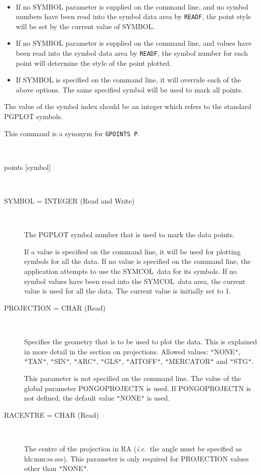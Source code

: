 \documentclass[twoside,11pt]{article}
\newcommand{\htmlref}[2]{#1}
\renewcommand{\_}{\texttt{\symbol{95}}}
\newcommand{\ie}{{\em i.e.\ }}
\newcommand{\symcol}{{\sf SYMCOL}}
\newcommand{\cnam}[1]{{\tt #1}}
\newcommand{\iref} [1]{\htmlref{#1}{#1}}
\newcommand{\sstusage}[1]{\item[Usage:] \mbox{}
\\[1.3ex]{\raggedright \ssttt #1}}
\newcommand{\sstparameters}[1]{
   \item[Parameters:] \mbox{} \\
   \vspace{-3.5ex}
   \begin{description}
      #1
   \end{description}
}
\newcommand{\sstsubsection}[1]{ \item[{#1}] \mbox{} \\}
\newcommand{\sstitemlist}[1]{
  \mbox{} \\
  \vspace{-3.5ex}
  \begin{itemize}
     #1
  \end{itemize}
}
\newcommand{\sstitem}{\item}
\newcommand{\sstusage}[1]{\item[Usage:]
      \begin{description}
         {\ssttt #1}
      \end{description}
      \\
   }
\newcommand{\sstparameters}[1]{
      \item[Parameters:] \\
      \begin{description}
         #1
      \end{description}
      \\
   }
\newcommand{\sstsubsection}[1]{\item[{#1}]}
\newcommand{\sstitemlist}[1]{
      \begin{itemize}
         #1
      \end{itemize}
      \\
   }
\newcommand{\sstitem}{\item}
\begin{document}
\begin{sloppypar}
{{      \sstitemlist{

         \sstitem
            If no SYMBOL parameter is supplied on the command line, and
            no symbol numbers have been read into the symbol data area by
            \cnam{\iref{READF}}, the point style will be set by the current value of
            SYMBOL.

         \sstitem
            If no SYMBOL parameter is supplied on the command line, and
            values have been read into the symbol data area by \cnam{READF}, the
            symbol number for each point will determine the style of the
            point plotted.

         \sstitem
            If SYMBOL is specified on the command line, it will override
            each of the above options. The same specified symbol will be
            used to mark all points.

      }
      The value of the symbol index should be an integer which refers
      to the standard PGPLOT symbols.

      This command is a synonym for \cnam{\iref{GPOINTS} P}.
   }
   \sstusage{
      points [symbol]
   }
\newpage
   \sstparameters{
      \sstsubsection{
         SYMBOL = \_INTEGER (Read and Write)
      }{
         The PGPLOT symbol number that is used to mark the data points.

         If a value is specified on the command line, it will be used
         for plotting symbols for all the data. If no value is
         specified on the command line, the application attempts to use
         the \symcol\ data for its symbols. If no symbol values have been
         read into the \symcol\ data area, the current value is used for
         all the data. The current value is initially set to 1.
      }
      \sstsubsection{
         PROJECTION = \_CHAR (Read)
      }{
         Specifies the geometry that is to be used to plot the data.
         This is explained in more detail in the section on
         projections.  Allowed values: {\tt "}NONE{\tt "}, {\tt "}TAN{\tt "}, {\tt "}SIN{\tt "}, {\tt "}ARC{\tt "},
         {\tt "}GLS{\tt "}, {\tt "}AITOFF{\tt "}, {\tt "}MERCATOR{\tt "} and {\tt "}STG{\tt "}.

         This parameter is not specified on the command line. The value
         of the global parameter PONGO\_PROJECTN is used. If
         PONGO\_PROJECTN is not defined, the default value {\tt "}NONE{\tt "} is
         used.
      }
      \sstsubsection{
         RACENTRE = \_CHAR (Read)
      }{
         The centre of the projection in RA (\ie the angle must be
         specified as hh:mm:ss.sss). This parameter is only required for
         PROJECTION values other than {\tt "}NONE{\tt "}.

}}}
\end{sloppypar}
\end{document}
